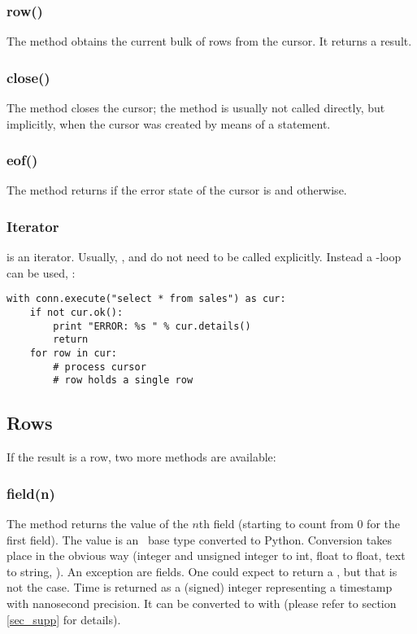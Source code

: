 \subsubsection{row()}
The method obtains the current
bulk of rows from the cursor.
It returns a  result.

\subsubsection{close()}
The method closes the cursor;
the method is usually not called directly,
but implicitly, when the cursor was
created by means of a  statement.

\subsubsection{eof()}
The method returns 
if the error state of the cursor
is  and 
otherwise.

\subsubsection{Iterator}
 is an iterator.
Usually, , 
and  do not need to be called
explicitly.
Instead a -loop  can be used, \eg:

\begin{python}
\begin{lstlisting}
with conn.execute("select * from sales") as cur:
    if not cur.ok():
        print "ERROR: %s " % cur.details()
        return
    for row in cur:
        # process cursor
        # row holds a single row
\end{lstlisting}
\end{python}

\subsection{Rows}
If the result is a row,
two more methods are available:

\subsubsection{field(n)}
The method returns the value
of the $n$th field (starting to count
from 0 for the first field).
The value is an \sql\ base type
converted to Python.
Conversion takes place in the obvious way
(integer and unsigned integer to int,
 float to float, text to string, \etc).
An exception are  fields.
One could expect  to return
a , but that is not the case.
Time is returned as a (signed) integer
representing a  timestamp
with nanosecond precision.
It can be converted to  with 
(please refer to section \ref{sec_supp}
for details).

